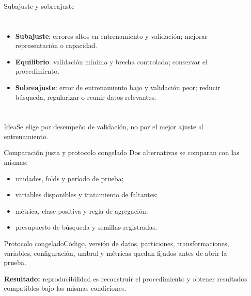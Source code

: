 \documentclass[aspectratio=169,10pt]{beamer}
\begin{document}
\begin{frame}{Subajuste y sobreajuste}
  \small
  \begin{columns}[T]
    \centering
    \scriptsize
    \begin{itemize}
      \item \textbf{Subajuste}: errores altos en entrenamiento y validación; mejorar representación o capacidad.
      \item \textbf{Equilibrio}: validación mínima y brecha controlada; conservar el procedimiento.
      \item \textbf{Sobreajuste}: error de entrenamiento bajo y validación peor; reducir búsqueda, regularizar o reunir datos relevantes.
    \end{itemize}
  \end{columns}
  \begin{block}{Idea}Se elige por desempeño de validación, no por el mejor ajuste al entrenamiento.\end{block}
\end{frame}

\begin{frame}{Comparación justa y protocolo congelado}
  \small Dos alternativas se comparan con las mismas:
  \begin{itemize}
    \item unidades, folds y período de prueba;
    \item variables disponibles y tratamiento de faltantes;
    \item métrica, clase positiva y regla de agregación;
    \item presupuesto de búsqueda y semillas registradas.
  \end{itemize}
  \begin{block}{Protocolo congelado}Código, versión de datos, particiones, transformaciones, variables, configuración, umbral y métricas quedan fijados antes de abrir la prueba.\end{block}
  \textbf{Resultado:} reproducibilidad es reconstruir el procedimiento y obtener resultados compatibles bajo las mismas condiciones.
\end{frame}
\end{document}

